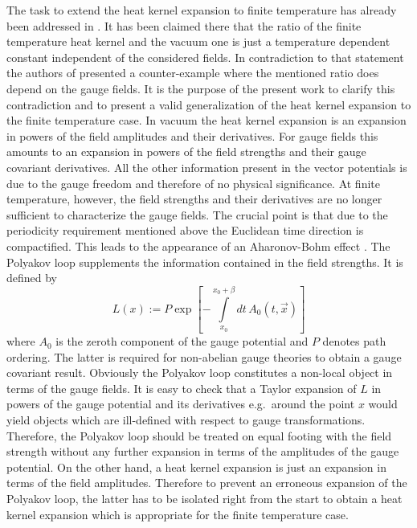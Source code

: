 \documentclass[a4paper,showpacs,showkeys,prd,nofootinbib]{revtex4}
\begin{document}
The task to extend the heat kernel expansion to finite temperature has
already been addressed in \cite{Boschi-Filho:1992ah}. It has been claimed there that the ratio
of the finite temperature heat kernel and the vacuum one is just a temperature
dependent constant independent of the considered fields. In contradiction to that
statement the authors of \cite{Actor:1998cn} presented a counter-example where the mentioned
ratio does depend on the gauge fields.
It is the purpose of the present work to clarify this contradiction and to present
a valid generalization of the heat kernel expansion to the finite temperature case.
In vacuum the heat kernel expansion is an expansion in powers of the field
amplitudes and their derivatives. For gauge fields this amounts to an expansion
in powers of the field strengths and their gauge covariant derivatives. All the
other information present in the vector potentials is due to the gauge freedom and
therefore of no physical significance. 
At finite temperature, however, the field strengths and their derivatives are no longer 
sufficient to characterize the gauge fields. The crucial point is that due to the
periodicity requirement mentioned above the Euclidean time direction is compactified.
This leads to the appearance of an Aharonov-Bohm effect \cite{Aharonov:1959fk}. 
The Polyakov loop 
\cite{Polyakov:1978vu} supplements the information contained in the field strengths. 
It is defined by
\begin{equation}
  \label{eq:defpoly}
L(x) := P \exp 
\left[-\int\limits_{x_0}^{x_0+\beta} dt \, A_0(t,\vec x) \right] 
\end{equation}
where $A_0$ is the zeroth component of the gauge potential and $P$ denotes path 
ordering. The latter is required for non-abelian gauge theories
to obtain a gauge covariant result. Obviously the Polyakov loop constitutes a
non-local object in terms of the gauge fields. It is easy to check that a
Taylor expansion of $L$ in powers of the gauge potential and its derivatives e.g.~around
the point $x$ would yield objects which are ill-defined with respect to gauge
transformations. Therefore, the Polyakov loop should be treated on equal footing
with the field strength without any further expansion in terms of the amplitudes of
the gauge potential. On the other hand, a heat kernel expansion is just an expansion
in terms of the field amplitudes. Therefore to prevent an erroneous expansion of 
the Polyakov loop, the latter has to be isolated right from the start to obtain
a heat kernel expansion which is appropriate for the finite temperature case.
\end{document}

